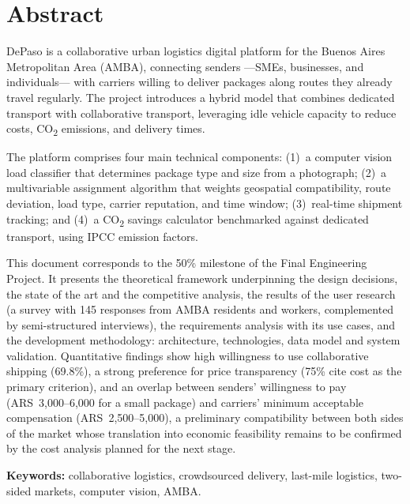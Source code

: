 \chapter*{Abstract}

DePaso is a collaborative urban logistics digital platform for the Buenos Aires Metropolitan Area (AMBA), connecting senders ---SMEs, businesses, and individuals--- with carriers willing to deliver packages along routes they already travel regularly. The project introduces a hybrid model that combines dedicated transport with collaborative transport, leveraging idle vehicle capacity to reduce costs, CO\textsubscript{2} emissions, and delivery times.

The platform comprises four main technical components: (1)~a computer vision load classifier that determines package type and size from a photograph; (2)~a multivariable assignment algorithm that weights geospatial compatibility, route deviation, load type, carrier reputation, and time window; (3)~real-time shipment tracking; and (4)~a CO\textsubscript{2} savings calculator benchmarked against dedicated transport, using IPCC emission factors.

{\color{nuevo}This document corresponds to the 50\% milestone of the Final Engineering Project. It presents the theoretical framework underpinning the design decisions, the state of the art and the competitive analysis, the results of the user research (a survey with 145 responses from AMBA residents and workers, complemented by semi-structured interviews), the requirements analysis with its use cases, and the development methodology: architecture, technologies, data model and system validation. Quantitative findings show high willingness to use collaborative shipping (69.8\%), a strong preference for price transparency (75\% cite cost as the primary criterion), and an overlap between senders' willingness to pay (ARS~3,000--6,000 for a small package) and carriers' minimum acceptable compensation (ARS~2,500--5,000), a preliminary compatibility between both sides of the market whose translation into economic feasibility remains to be confirmed by the cost analysis planned for the next stage.}

\textbf{Keywords:} collaborative logistics, crowdsourced delivery, last-mile logistics, two-sided markets, computer vision, AMBA.
